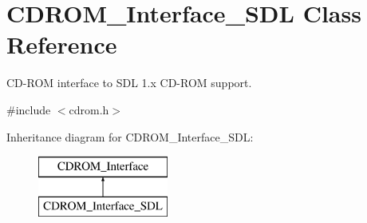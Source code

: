 \hypertarget{classCDROM__Interface__SDL}{\section{C\-D\-R\-O\-M\-\_\-\-Interface\-\_\-\-S\-D\-L Class Reference}
\label{classCDROM__Interface__SDL}
}


C\-D-\/\-R\-O\-M interface to S\-D\-L 1.\-x C\-D-\/\-R\-O\-M support.  




{\ttfamily \#include $<$cdrom.\-h$>$}

Inheritance diagram for C\-D\-R\-O\-M\-\_\-\-Interface\-\_\-\-S\-D\-L\-:\begin{figure}[H]
\begin{center}
\leavevmode
\includegraphics[height=2.000000cm]{classCDROM__Interface__SDL}
\end{center}
\end{figure}
